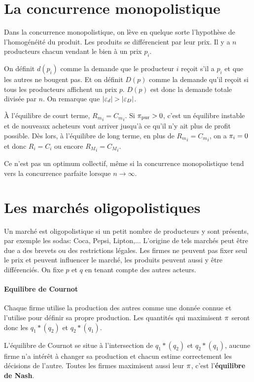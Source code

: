 \section{La concurrence monopolistique}
Dans la concurrence monopolistique, on lève en quelque sorte l'hypothèse de
l'homogénéité du produit.
Les produits se différencient par leur prix.
Il y a $n$ producteurs chacun vendant le bien à un prix $p_i$.

On définit $d(p_i)$ comme la demande que le producteur $i$ reçoit s'il a
$p_i$ et que les autres ne bougent pas.
Et on définit $D(p)$ comme la demande qu'il reçoit si tous
les producteurs affichent un prix $p$.
$D(p)$ est donc la demande totale divisée par $n$.
On remarque que $|\varepsilon_d| > |\varepsilon_D|$.

À l'équilibre de court terme, ${R_m}_i = {C_m}_i$.
Si $\pi_{\mathrm{pur}} > 0$, c'est un équilibre instable et de nouveaux
acheteurs vont arriver jusqu'à ce qu'il n'y ait plus de profit possible.
Dès lors, à l'équilibre de long terme,
en plus de ${R_m}_i = {C_m}_i$, on a $\pi_i = 0$ et donc $R_i = C_i$
ou encore ${R_M}_i = {C_M}_i$.

Ce n'est pas un optimum collectif, même si la concurrence monopolistique
tend vers la concurrence parfaite lorsque $n \to \infty$.

\section{Les marchés oligopolistiques}
Un marché est oligopolistique si un petit nombre de producteurs y sont présents,
par exemple les sodas: Coca, Pepsi, Lipton,... 
L'origine de tels marchés peut être due a des brevets ou des restrictions légales.
Les firmes ne peuvent pas fixer seul le prix et peuvent influencer le marché,
les produits peuvent aussi y être différenciés. 
On fixe $p$ et $q$ en tenant compte des autres acteurs. 

\paragraph{Equilibre de Cournot}
Chaque firme utilise la production des autres comme une donnée connue et
l'utilise pour définir sa propre production.
Les quantités qui maximisent $\pi$ seront donc les $q_1*(q_2)$ et $q_2*(q_1)$.

L'équilibre de Cournot se situe à l'intersection de $q_1*(q_2)$ et $q_2*(q_1)$,
aucune firme n'a intérêt à changer sa production et chacun estime correctement
les décisions de l'autre.
Toutes les firmes maximisent aussi leur $\pi$,
c'est l'\textbf{équilibre de Nash}.

